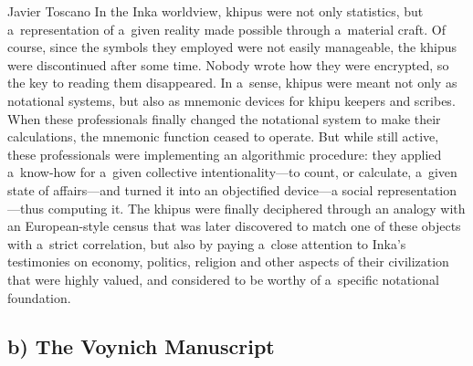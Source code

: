 \begin{artengenv}{Javier Toscano}
In the Inka worldview, khipus were not only statistics, but a~representation of a~given reality made possible through a~material craft. Of course, since the symbols they employed were not easily manageable, the khipus were discontinued after some time. Nobody wrote how they were encrypted, so the key to reading them disappeared. In a~sense, khipus were meant not only as notational systems, but also as mnemonic devices for khipu keepers and scribes. When these professionals finally changed the notational system to make their calculations, the mnemonic function ceased to operate. But while still active, these professionals were implementing an algorithmic procedure: they applied a~know-how for a~given collective intentionality---to count, or calculate, a~given state of affairs---and turned it into an objectified device---a social representation---thus computing it. The khipus were finally deciphered through an analogy with an European-style census that was later discovered to match one of these objects with a~strict correlation, but also by paying a~close attention to Inka's testimonies on economy, politics, religion and other aspects of their civilization that were highly valued, and considered to be worthy of a~specific notational foundation.

\subsection*{b) The Voynich Manuscript}


\end{artengenv}
